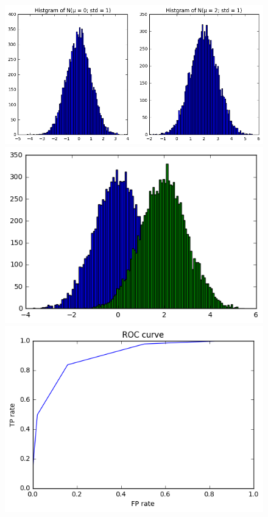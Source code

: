 \documentclass[a4paper,11pt]{article}
\begin{document}
\begin{figure}[htbp]
  \includegraphics[scale=0.5]{hist12.png}
  \includegraphics[scale=1.]{histmix.png}
  \includegraphics[scale=1.]{roc.png}
\end{figure}
\end{document}
